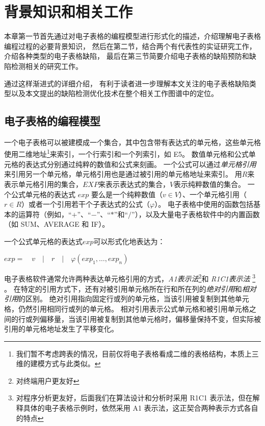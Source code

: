 \chapter{背景知识和相关工作}
本章第一节首先通过对电子表格的编程模型进行形式化的描述，介绍理解电子表格编程过程的必要背景知识，
然后在第二节，结合两个有代表性的实证研究工作，介绍各种类型的电子表格缺陷，
最后在第三节简要介绍电子表格的缺陷预防和缺陷检测相关的研究工作。

通过这样渐进式的详细介绍，
有利于读者进一步理解本文关注的电子表格缺陷类型以及本文提出的缺陷检测优化技术在整个相关工作图谱中的定位。


\section{电子表格的编程模型}
一个电子表格可以被建模成一个集合，其中包含带有表达式的单元格，这些单元格使用二维地址\footnote{我们暂不考虑跨表的情况，目前仅将电子表格看成二维的表格结构，本质上三维的建模方式与此类似。}来索引，一个行索引和一个列索引，如 E5。
数值单元格和公式单元格的表达式分别通过纯粹的数值和公式来刻画。
一个公式可以通过\textit{单元格引用}来引用另一个单元格，单元格引用也是通过被引用的单元格地址来索引。
用$R$来表示单元格引用的集合，$EXP$来表示表达式的集合，$V$表示纯粹数值的集合。
一个公式单元格的表达式 $exp$ 要么是一个纯粹数值（$v \in V$）、一个单元格引用（$r \in R$）或者一个引用若干个子表达式的公式（$\varphi $）。
电子表格中使用的函数包括基本的运算符（例如，“$+$”、“$-$”、“$*$”和“$/$”），以及大量电子表格软件中的内置函数（如 SUM、AVERAGE 和 IF）。

一个公式单元格的表达式$exp$可以形式化地表达为：
\begin{definition}
    $ exp =\quad v\quad |\quad r\quad |\quad \varphi (exp_1,\dots,exp_n) $
\end{definition}

电子表格软件通常允许两种表达单元格引用的方式，\textit{A1表示法}\footnote{对终端用户更友好}和 \textit{R1C1表示法} \footnote{对程序分析更友好，后面我们在算法设计和分析时采用 R1C1 表示法，但在解释具体的电子表格示例时，依然采用 A1 表示法，这正契合两种表示方式各自的特点} \cite{tan2014bug}。
在特定的引用方式下，还有对被引用单元格所在行和所在列的\textit{绝对引用}和\textit{相对引用}的区别。
绝对引用指向固定行或列的单元格，当该引用被复制到其他单元格，仍然引用相同行或列的单元格。
相对引用表示公式单元格和被引用单元格之间的行或列偏移量，当该引用被复制到其他单元格时，偏移量保持不变，但实际被引用的单元格地址发生了平移变化。




